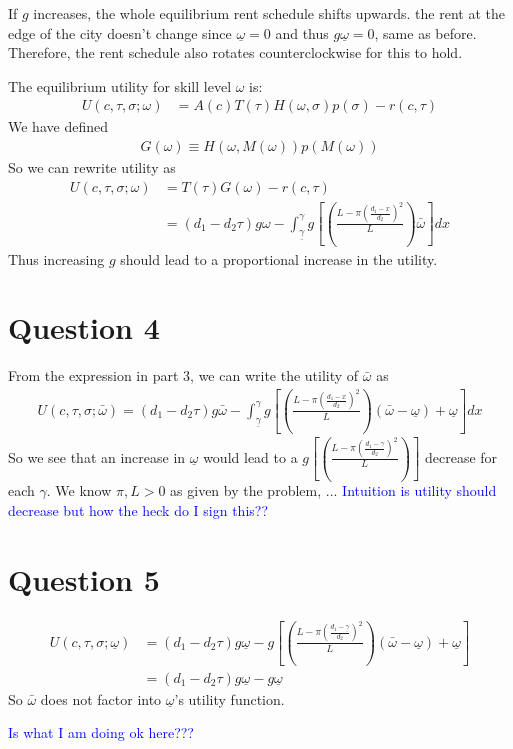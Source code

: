 \documentclass{article}
\begin{document}
If $g$ increases, the whole equilibrium rent schedule shifts upwards.  the rent at the edge of the city doesn't change since $\underline{\omega} = 0$ and thus $g\underline{\omega} = 0$, same as before. Therefore, the rent schedule also rotates counterclockwise for this to hold.

The equilibrium utility for skill level $\omega$ is:
\begin{align*}
    U(c, \tau, \sigma ; \omega)&=A(c) T(\tau) H(\omega, \sigma) p(\sigma)-r(c, \tau) 
\end{align*}
We have defined 
\begin{align*}
    G(\omega) \equiv H(\omega, M(\omega)) p(M(\omega))
\end{align*}
So we can rewrite utility as 
\begin{align*}
    U(c, \tau, \sigma ; \omega)&=T(\tau) G(\omega)-r(c, \tau) \\
    &=\left(d_{1}-d_{2} \tau\right) g \omega-\int_{\underline{\gamma}}^{\gamma} g\left[\left(\frac{L-\pi\left(\frac{d_{1}-x}{d_{2}}\right)^{2}}{L}\right) \bar{\omega}\right] d x
\end{align*}
Thus increasing $g$ should lead to a proportional increase in the utility. 

\section*{Question 4}
From the expression in part 3, we can write the utility of $\bar{\omega}$ as
\begin{align*}
    U(c, \tau, \sigma ; \bar{\omega})=\left(d_{1}-d_{2} \tau\right) g \bar{\omega}-\int_{\underline{\gamma}}^{\gamma} g\left[\left(\frac{L-\pi\left(\frac{d_{1}-x}{d_{2}}\right)^{2}}{L}\right)(\bar{\omega}-\underline{\omega})+\underline{\omega}\right] d x
\end{align*}
So we see that an increase in $\underline{\omega}$ would lead to a $g\left[\left(\frac{L-\pi\left(\frac{d_{1}-\gamma}{d_{2}}\right)^{2}}{L}\right)\right]$ decrease for each $\gamma$. We know $\pi, L > 0$ as given by the problem, ... \textcolor{blue}{Intuition is utility should decrease but how the heck do I sign this??}

\section*{Question 5}
\begin{align*}
    U(c, \tau, \sigma ; \underline{\omega})&=\left(d_{1}-d_{2} \tau\right) g \underline{\omega}-g\left[\left(\frac{L-\pi\left(\frac{d_{1}-\underline{\gamma}}{d_{2}}\right)^{2}}{L}\right)(\bar{\omega}-\underline{\omega})+\underline{\omega}\right] \\
    &= \left(d_{1}-d_{2} \tau\right) g \underline{\omega} - g\underline{\omega}
\end{align*}
So $\bar{\omega}$ does not factor into $\underline{\omega}$'s utility function. 

\textcolor{blue}{Is what I am doing ok here???}
\end{document}
